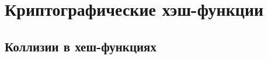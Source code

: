 \chapter{Криптографические хэш-функции}\label{chapter-hash-functions}







\section{Коллизии в хеш-функциях}




